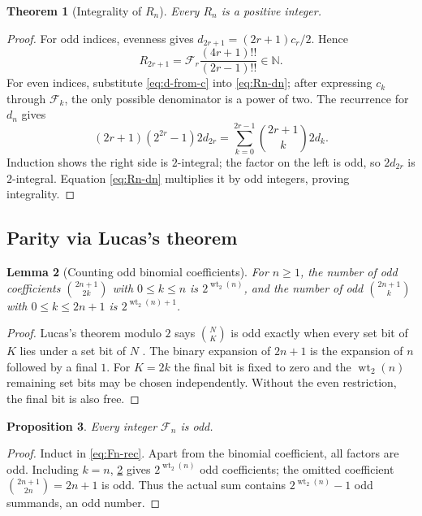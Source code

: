 \documentclass[11pt]{article}
\newtheorem{theorem}{Theorem}[section]
\newtheorem{proposition}[theorem]{Proposition}
\newtheorem{lemma}[theorem]{Lemma}
\theoremstyle{definition}
\theoremstyle{remark}
\newcommand{\N}{\mathbb N}\newcommand{\Q}{\mathbb Q}
\newcommand{\wt}{\operatorname{wt}_2}\newcommand{\upfun}{\operatorname{up}}
\begin{document}
\begin{theorem}[Integrality of $R_n$]\label{thm:Rn-integral}
Every $R_n$ is a positive integer.
\end{theorem}
\begin{proof}
For odd indices, evenness gives $d_{2r+1}=(2r+1)c_r/2$.  Hence
\begin{equation}\label{eq:R-odd}
 R_{2r+1}=\mathcal F_r\frac{(4r+1)!!}{(2r-1)!!}\in\N.
\end{equation}
For even indices, substitute \eqref{eq:d-from-c} into \eqref{eq:Rn-dn}; after expressing $c_k$ through $\mathcal F_k$, the only possible denominator is a power of two.  The recurrence for $d_n$ gives
\begin{equation}\label{eq:even-d-recurrence}
 (2r+1)(2^{2r}-1)2d_{2r}
 =\sum_{k=0}^{2r-1}\binom{2r+1}{k}2d_k.
\end{equation}
Induction shows the right side is $2$-integral; the factor on the left is odd, so $2d_{2r}$ is $2$-integral.  Equation \eqref{eq:Rn-dn} multiplies it by odd integers, proving integrality.
\end{proof}

\subsection{Parity via Lucas's theorem}
\begin{lemma}[Counting odd binomial coefficients]\label{lem:odd-binomials}
For $n\ge1$, the number of odd coefficients $\binom{2n+1}{2k}$ with $0\le k\le n$ is $2^{\wt(n)}$, and the number of odd $\binom{2n+1}{k}$ with $0\le k\le2n+1$ is $2^{\wt(n)+1}$.
\end{lemma}
\begin{proof}
Lucas's theorem modulo $2$ says $\binom NK$ is odd exactly when every set bit of $K$ lies under a set bit of $N$ \cite{Fine}.  The binary expansion of $2n+1$ is the expansion of $n$ followed by a final $1$.  For $K=2k$ the final bit is fixed to zero and the $\wt(n)$ remaining set bits may be chosen independently.  Without the even restriction, the final bit is also free.
\end{proof}

\begin{proposition}\label{prop:Fn-odd}
Every integer $\mathcal F_n$ is odd.
\end{proposition}
\begin{proof}
Induct in \eqref{eq:Fn-rec}.  Apart from the binomial coefficient, all factors are odd.  Including $k=n$, \cref{lem:odd-binomials} gives $2^{\wt(n)}$ odd coefficients; the omitted coefficient $\binom{2n+1}{2n}=2n+1$ is odd.  Thus the actual sum contains $2^{\wt(n)}-1$ odd summands, an odd number.
\end{proof}
\end{document}
